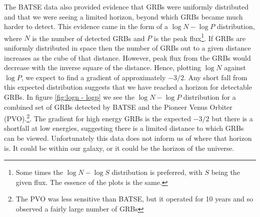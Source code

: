 \documentclass[11pt]{cuthesis}
\begin{document}
The BATSE data also provided evidence that GRBs were uniformly distributed and that we were seeing a limited horizon, beyond which GRBs became much harder to detect. This evidence came in the form of a $\log N - \log P$ distribution, where $N$ is the number of detected GRBs and $P$ is the peak flux\footnote{Some times the $\log N - \log S$ distribution is preferred, with $S$ being the given flux. The essence of the plots is the same.}. If GRBs are uniformly distributed in space then the number of GRBs out to a given distance increases as the cube of that distance. However, peak flux from the GRBs would decrease with the inverse square of the distance. Hence, plotting  $\log N$ against $\log P$, we expect to find a gradient of approximately $-3/2$. Any short fall from this expected distribution suggests that we have reached a horizon for detectable GRBs. In figure \ref{fig:logn - logp} we see the $\log N - \log P$ distribution for a combined set of GRBs detected by BATSE and the Pioneer Venus Orbiter (PVO).\footnote{ The PVO was less sensitive than BATSE, but it operated for 10 years and so observed a fairly large number of GRBs}. The gradient for high energy GRBs is the expected $-3/2$ but there is a shortfall at low energies, suggesting there is a limited distance to which GRBs can be viewed. Unfortunately this data does not inform us of where that horizon is. It could be within our galaxy, or it could be the horizon of the universe.   
\end{document}
